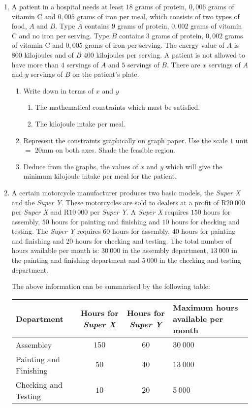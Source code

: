 \begin{eocexercises}{}
\begin{enumerate}
\item{A patient in a hospital needs at least $18$ grams of protein, $0,006$ grams of vitamin C and $0,005$ grams of iron per meal, which consists of two types of food, $A$ and $B$. Type $A$ contains $9$ grams of protein, $0,002$ grams of vitamin C and no iron per serving. Type $B$ contains $3$ grams of protein, $0,002$ grams of vitamin C and $0,005$ grams of iron per serving. The energy value of $A$ is $800$ kilojoules and of $B$ $400$ kilojoules per serving. A patient is not allowed to have more than $4$ servings of $A$ and $5$ servings of $B$. There are $x$ servings of $A$ and $y$ servings of $B$ on the patient's plate.
\begin{enumerate}
\item{Write down in terms of $x$ and $y$}
\begin{enumerate}
\item{The mathematical constraints which must be satisfied.}
\item{The kilojoule intake per meal.}
\end{enumerate}
\item{Represent the constraints graphically on graph paper. Use the scale $1$ unit $=$ $20$mm on both axes. Shade the feasible region.}
\item{Deduce from the graphs, the values of $x$ and $y$ which will give the minimum kilojoule intake per meal for the patient.}
\end{enumerate}}
\item{A certain motorcycle manufacturer produces two basic models, the \textit{Super X} and the \textit{Super Y}. These motorcycles are sold to dealers at a profit of R$20~000$ per \textit{Super X} and R$10~000$ per \textit{Super Y}. A \textit{Super X} requires $150$ hours for assembly, $50$ hours for painting and finishing and $10$ hours for checking and testing. The \textit{Super Y} requires $60$ hours for assembly, $40$ hours for painting and finishing and $20$ hours for checking and testing. The total number of hours available per month is: $30~000$ in the assembly department, $13~000$ in the painting and finishing department and $5~000$ in the checking and testing department.

The above information can be summarised by the following table:

\begin{center}
\begin{tabular}{|l|c|c|p{3cm}|}\hline
Department& Hours for \textit{Super X}&Hours for \textit{Super Y}& Maximum hours available per month\\\hline\hline
Assembley&$150$&$60$&$30~ 000$\\\hline
Painting and Finishing & $50$& $40$ &$13~ 000$\\\hline
Checking and Testing &$10$&$20$&$5~ 000$\\\hline
\end{tabular}
\end{center}

}
\end{enumerate}
\end{eocexercises}
